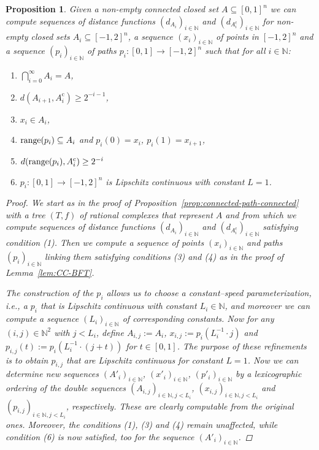 \documentclass[a4paper]{amsart}
\def\IN{{\mathbb{N}}}
\def\In{\subseteq}
\def\range{{\rm range}}
\def\cc{\mathrm c}
\newtheorem{proposition}[theorem]{Proposition}
\theoremstyle{definition}
\begin{document}
\begin{proposition}
\label{prop:largedistanceshortpath}
Given a non-empty connected closed set $A \subseteq [0,1]^n$ we can compute sequences of distance functions $(d_{A_i})_{i \in \IN}$ and $(d_{A^\cc_i})_{i \in\IN}$
for non-empty closed sets $A_i \subseteq [-1, 2]^n$, a sequence $(x_i)_{i \in\IN}$ of points in $[-1, 2]^n$ and a sequence 
$(p_i)_{i \in\IN}$ of paths $p_i:[0,1]\to[-1, 2]^n$ such that for all $i\in\IN$:
\begin{enumerate}
\item $\bigcap_{i=0}^\infty A_i = A$,
\item $d(A_{i+1}, A_i^\cc) \geq 2^{-i-1}$,
\item $x_i \in A_i$,
\item $\range(p_i)\In A_i$ and $p_i(0) = x_i$, $p_i(1) = x_{i+1}$,
\item $d(\range(p_i), A_i^\cc) \geq 2^{-i}$
\item $p_i:[0,1]\to[-1,2]^n$ is Lipschitz continuous with constant $L=1$.
\end{enumerate}
\begin{proof}
We start as in the proof of Proposition~\ref{prop:connected-path-connected} with a tree $(T,f)$ of rational complexes that represent $A$
and from which we compute sequences of distance functions $(d_{A_i})_{i \in \IN}$ and $(d_{A^\cc_i})_{i \in\IN}$ satisfying condition (1).
Then we compute a sequence of points $(x_i)_{i\in\IN}$ and paths $(p_i)_{i\in\IN}$ linking them satisfying conditions (3) and (4) as in the proof of Lemma~\ref{lem:CC-BFT}. 

The construction of the $p_i$ allows us to choose a constant--speed parameterization, i.e., a $p_i$ that is Lipschitz continuous with constant $L_i \in \mathbb{N}$, and moreover 
we can compute a sequence $(L_i)_{i\in\IN}$ of corresponding constants.
Now for any $(i, j)\in\IN^2$ with $j < L_i$, define $A_{i,j} := A_i$, $x_{i,j} := p_i(L_i^{-1}\cdot j)$ and $p_{i,j}(t) := p_i(L_i^{-1}\cdot(j + t))$ for $t\in[0,1]$. 
The purpose of these refinements is to obtain $p_{i,j}$ that are Lipschitz continuous for constant $L=1$.
Now we can determine new sequences $(A'_i)_{i\in\IN}$, $(x'_i)_{i\in\IN}$, $(p'_i)_{i\in\IN}$ by a lexicographic ordering of the double sequences 
$(A_{i,j})_{i\in\IN,j<L_i}$, $(x_{i,j})_{i\in\IN,j<L_i}$ and $(p_{i,j})_{i\in\IN,j<L_i}$, respectively.
These are clearly computable from the original ones. Moreover, the conditions (1), (3) and (4) remain unaffected, while condition (6) is now satisfied, too for the sequence $(A'_i)_{i\in\IN}$.


\end{proof}
\end{proposition}
\end{document}
